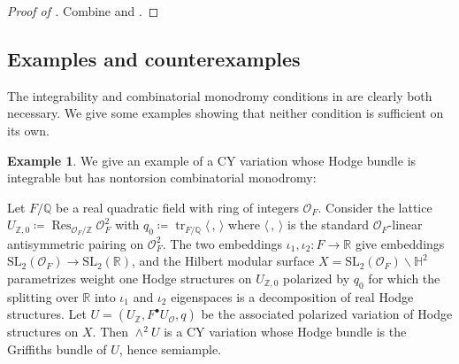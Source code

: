\documentclass{amsart}
\theoremstyle{definition}
\newtheorem{eg}[theorem]{Example}
\theoremstyle{remark}
\def\bH{\mathbb{H}}
\def\bZ{\mathbb{Z}}
\def\bQ{\mathbb{Q}}
\def\bR{\mathbb{R}}
\def\cO{\mathcal{O}}
\def\SL{\mathrm{SL}}
\def\Res{\operatorname{Res}}
\def\tr{\operatorname{tr}}
\numberwithin{equation}{section}
\begin{document}
\begin{proof}[Proof of ]  Combine  and .
\end{proof}

\subsection{Examples and counterexamples}The integrability and combinatorial monodromy conditions in  are clearly both necessary.  We give some examples showing that neither condition is sufficient on its own.
\begin{eg}\label{eg:int not tor}
We give an example of a CY variation whose Hodge bundle is integrable but has nontorsion combinatorial monodromy:


Let $F/\bQ$ be a real quadratic field with ring of integers $\cO_F$.  Consider the lattice $U_{\bZ,0}\coloneqq  \Res_{\cO_F/\bZ}\cO_F^2$ with $q_0\coloneqq  \tr_{F/\bQ}\langle\,,\,\rangle$ where $\langle\,,\,\rangle$ is the standard $\cO_F$-linear antisymmetric pairing on $\cO_F^2$. 
 The two embeddings $\iota_1,\iota_2:F\to \bR$ give embeddings $\SL_2(\cO_F)\to\SL_2(\bR)$, and the Hilbert modular surface $X=\SL_2(\cO_F)\backslash \bH^2$ parametrizes weight one Hodge structures on $U_{\bZ,0}$ polarized by $q_0$ for which the splitting over $\bR$ into $\iota_1$ and $\iota_2$ eigenspaces is a decomposition of real Hodge structures.  Let $U=(U_\bZ,F^\bullet U_\cO,q)$ be the associated polarized variation of Hodge structures on $X$.  Then $\wedge^2U$ is a CY variation whose Hodge bundle is the Griffiths bundle of $U$, hence semiample.  
 

\end{eg}
\end{document}

